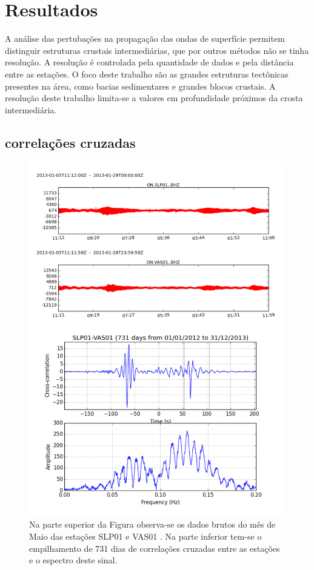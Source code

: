 \section{Resultados}

A análise das pertubações na propagação das ondas de superfície permitem distinguir estruturas crustais intermediárias, que por outros métodos não se tinha resolução. A resolução é controlada pela quantidade de dados e pela distância entre as estações. O foco deste trabalho são as grandes estruturas tectônicas presentes na área, como bacias sedimentares e grandes blocos crustais. A resolução deste trabalho limita-se a valores em profundidade próximos da crosta intermediária.

\subsection{correlações cruzadas}

\begin{figure}[!ht]
\centering
\includegraphics[scale=0.5]{Figs/corr_dado_bruto.png}
\caption[Dados Brutos das estações SLP01 e VAS01 e a correlação dos mesmos.]{Na parte superior da Figura observa-se os dados brutos do mês de Maio das estações SLP01 e VAS01 . Na parte inferior tem-se o empilhamento de 731 dias de correlações cruzadas entre as estações e o espectro deste sinal.}
\label{corr_dado_bruto}
\end{figure}

